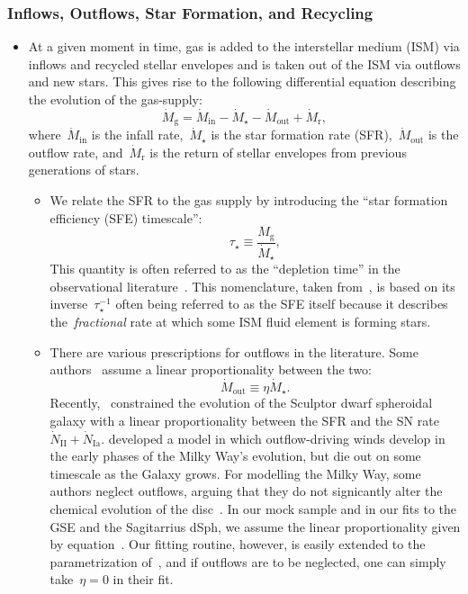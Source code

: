 \documentclass[ms.tex]{subfiles}
\begin{document}
\subsubsection{Inflows, Outflows, Star Formation, and Recycling}
\label{sec:methods:onezone:gas}

\begin{itemize}

	\item At a given moment in time, gas is added to the interstellar medium
	(ISM) via inflows and recycled stellar envelopes and is taken out of the
	ISM via outflows and new stars.
	This gives rise to the following differential equation describing the
	evolution of the gas-supply:
	\begin{equation}
	\dot{M}_\text{g} = \dot{M}_\text{in} - \dot{M}_\star - \dot{M}_\text{out}
	+ \dot{M}_\text{r},
	\end{equation}
	where~$\dot{M}_\text{in}$ is the infall rate,~$\dot{M}_\star$ is the star
	formation rate (SFR),~$\dot{M}_\text{out}$ is the outflow rate,
	and~$\dot{M}_\text{r}$ is the return of stellar envelopes from previous
	generations of stars.

	\begin{itemize}
		\item We relate the SFR to the gas supply by introducing the ``star
		formation efficiency (SFE) timescale'':
		\begin{equation}
		\tau_\star \equiv \frac{M_\text{g}}{\dot{M}_\star},
		\end{equation}
		This quantity is often referred to as the ``depletion time'' in the
		observational literature~\citep[e.g.][]{Tacconi2018}.
		This nomenclature, taken from~\citet{Weinberg2017}, is based on its
		inverse~$\tau_\star^{-1}$ often being referred to as the SFE itself
		because it describes the~\textit{fractional} rate at which some ISM
		fluid element is forming stars.

		\item There are various prescriptions for outflows in the literature.
		Some authors~\citep[e.g.][]{Andrews2017, Weinberg2017} assume a linear
		proportionality between the two:
		\begin{equation}
		\label{eq:eta}
		\dot{M}_\text{out} \equiv \eta\dot{M}_\star.
		\end{equation}
		Recently,~\citet{delosReyes2022} constrained the evolution of the
		Sculptor dwarf spheroidal galaxy with a linear proportionality between
		the SFR and the SN rate~$\dot{N}_\text{II} + \dot{N}_\text{Ia}$.
		\citet*{Kobayashi2020} developed a model in which outflow-driving winds
		develop in the early phases of the Milky Way's evolution, but die out
		on some timescale as the Galaxy grows.
		For modelling the Milky Way, some authors neglect outflows, arguing
		that they do not signicantly alter the chemical evolution of the
		disc~\citep[e.g.][]{Spitoni2019, Spitoni2021}.
		In our mock sample and in our fits to the GSE and the Sagitarrius dSph,
		we assume the linear proportionality given by equation~.
		Our fitting routine, however, is easily extended to the parametrization
		of~\citet{delosReyes2022}, and if outflows are to be neglected, one can
		simply take~$\eta = 0$ in their fit.


\end{itemize}
\end{itemize}
\end{document}
